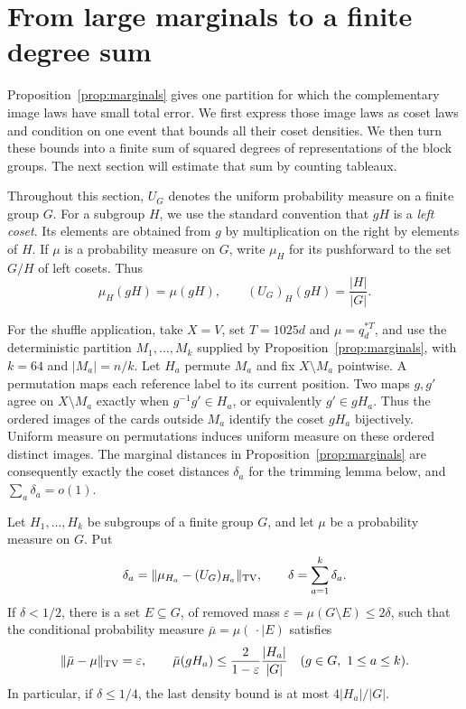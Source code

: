 \section{From large marginals to a finite degree sum}
\label{sec:lift}

Proposition~\ref{prop:marginals} gives one partition for which the
complementary image laws have small total error. We first express those
image laws as coset laws and condition on one event that bounds all their
coset densities. We then turn these bounds into a finite sum of squared
degrees of representations of the block groups. The next section will
estimate that sum by counting tableaux.

Throughout this section, \(U_G\) denotes the uniform probability measure on
a finite group \(G\). For a subgroup \(H\), we use the standard convention
that \(gH\) is a \emph{left coset}. Its elements are obtained from \(g\) by
multiplication on the right by elements of \(H\). If \(\mu\) is a probability
measure on \(G\), write \(\mu_H\) for its pushforward to the set \(G/H\) of
left cosets. Thus
\[
  \mu_H(gH)=\mu(gH),
  \qquad (U_G)_H(gH)=\frac{|H|}{|G|}.
\]

For the shuffle application, take $X=V$, set $T=1025d$ and
$\mu=q_d^{*T}$, and use the deterministic partition
$M_1,\ldots,M_k$ supplied by Proposition~\ref{prop:marginals},
with $k=64$ and $|M_a|=n/k$. Let $H_a$ permute $M_a$ and fix
$X\setminus M_a$ pointwise.
A permutation maps each reference label to its current position. Two maps
\(g,g'\) agree on \(X\setminus M_a\) exactly when
\(g^{-1}g'\in H_a\), or equivalently \(g'\in gH_a\). Thus the ordered
images of the cards outside \(M_a\) identify the coset \(gH_a\)
bijectively. Uniform measure on permutations induces uniform measure on
these ordered distinct images. The marginal distances in
Proposition~\ref{prop:marginals} are consequently exactly the coset
distances \(\delta_a\) for the trimming lemma below, and
\(\sum_a\delta_a=o(1)\).

\begin{lemma}
\label{lem:trim}
Let \(H_1,\ldots,H_k\) be subgroups of a finite group \(G\), and let
\(\mu\) be a probability measure on \(G\). Put
\[
  \delta_a=\|\mu_{H_a}-(U_G)_{H_a}\|_{\mathrm{TV}},
  \qquad \delta=\sum_{a=1}^k\delta_a.
\]
If \(\delta<1/2\), there is a set \(E\subseteq G\), of removed mass
\(\varepsilon=\mu(G\setminus E)\le 2\delta\), such that the conditional
probability measure \(\bar\mu=\mu(\,\cdot\mid E)\) satisfies
\begin{equation}
\label{eq:lift:trim}
  \|\bar\mu-\mu\|_{\mathrm{TV}}=\varepsilon,
  \qquad
  \bar\mu(gH_a)
  \le \frac{2}{1-\varepsilon}\frac{|H_a|}{|G|}
  \quad(g\in G,\ 1\le a\le k).
\end{equation}
In particular, if \(\delta\le 1/4\), the last density bound is at most
\(4|H_a|/|G|\).
\end{lemma}

